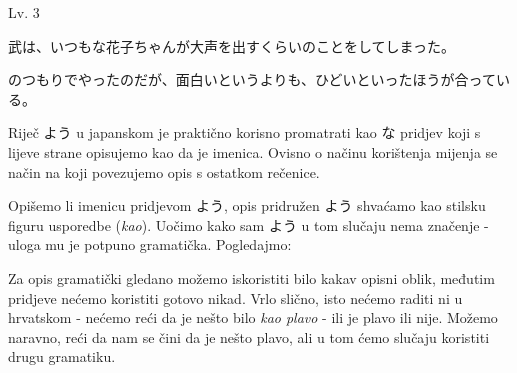 	\begin{mondai}{Lv. 3}
		\item 武は、いつもな花子ちゃんが大声を出すくらいのことをしてしまった。
		\item {}のつもりでやったのだが、面白いというよりも、ひどいといったほうが合っている。
	\end{mondai}
\newpage
{}

	
	
	
	Riječ よう u japanskom je praktično korisno promatrati kao な pridjev koji s lijeve strane opisujemo kao da je imenica. Ovisno o načinu korištenja mijenja se način na koji povezujemo opis s ostatkom rečenice.
	
	
	Opišemo li imenicu pridjevom よう, opis pridružen よう shvaćamo kao stilsku figuru usporedbe (\textit{kao}). Uočimo kako sam よう u tom slučaju nema značenje - uloga mu je potpuno gramatička. Pogledajmo:
	
	\begin{reibun}
	\end{reibun}

	Za opis gramatički gledano možemo iskoristiti bilo kakav opisni oblik, međutim pridjeve nećemo koristiti gotovo nikad. Vrlo slično, isto nećemo raditi ni u hrvatskom - nećemo reći da je nešto bilo \textit{kao plavo} - ili je plavo ili nije. Možemo naravno, reći da nam se čini da je nešto plavo, ali u tom ćemo slučaju koristiti drugu gramatiku\footnotemark[2].
	
	
